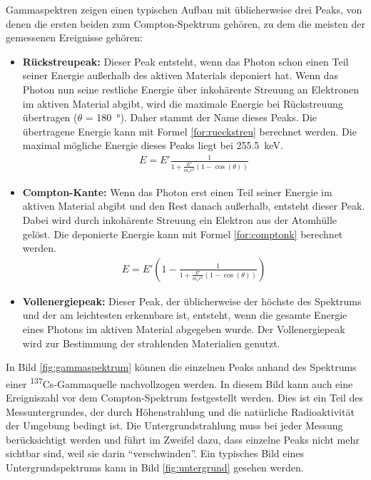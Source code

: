 \documentclass[german, %
parskip=full, %
bibliography=totoc, %
]{scrartcl}
\begin{document}
Gammaspektren zeigen einen typischen Aufbau mit üblicherweise drei Peaks, von denen die ersten beiden zum Compton-Spektrum gehören, zu dem die meisten der gemessenen Ereignisse gehören:
\begin{itemize}
\item \textbf{Rückstreupeak: }Dieser Peak entsteht, wenn das Photon schon einen Teil seiner Energie außerhalb des aktiven Materials deponiert hat. Wenn das Photon nun seine restliche Energie über inkohärente Streuung an Elektronen im aktiven Material abgibt, wird die maximale Energie bei Rückstreuung übertragen ($\theta$ = \SI{180}{\degree}). Daher stammt der Name dieses Peaks. Die übertragene Energie kann mit Formel \ref{for:rueckstreu} berechnet werden. Die maximal mögliche Energie dieses Peaks liegt bei \SI{255.5}{\kilo\electronvolt}.
\begin{align}
E = E' \frac{1}{1 + \frac{E'}{m_e c^2} (1 - \cos (\theta))} \label{for:rueckstreu}
\end{align}
\item \textbf{Compton-Kante: }Wenn das Photon erst einen Teil seiner Energie im aktiven Material abgibt und den Rest danach außerhalb, entsteht dieser Peak. Dabei wird durch inkohärente Streuung ein Elektron aus der Atomhülle gelöst. Die deponierte Energie kann mit Formel \ref{for:comptonk} berechnet werden.
\begin{align}
E = E' (1 - \frac{1}{1 + \frac{E'}{m_e c^2} (1 - \cos (\theta))}) \label{for:comptonk}
\end{align}
\item \textbf{Vollenergiepeak: }Dieser Peak, der üblicherweise der höchste des Spektrums und der am leichtesten erkennbare ist, entsteht, wenn die gesamte Energie eines Photons im aktiven Material abgegeben wurde. Der Vollenergiepeak wird zur Bestimmung der strahlenden Materialien genutzt.
\end{itemize}
In Bild \ref{fig:gammaspektrum} können die einzelnen Peaks anhand des Spektrums einer \textsuperscript{137}Cs-Gammaquelle nachvollzogen werden. In diesem Bild kann auch eine Ereigniszahl vor dem Compton-Spektrum festgestellt werden. Dies ist ein Teil des Messuntergrundes, der durch Höhenstrahlung und die natürliche Radioaktivität der Umgebung bedingt ist. Die Untergrundstrahlung muss bei jeder Messung berücksichtigt werden und führt im Zweifel dazu, dass einzelne Peaks nicht mehr sichtbar sind, weil sie darin "`verschwinden"'. Ein typisches Bild eines Untergrundspektrums kann in Bild \ref{fig:untergrund} gesehen werden.
\end{document}
